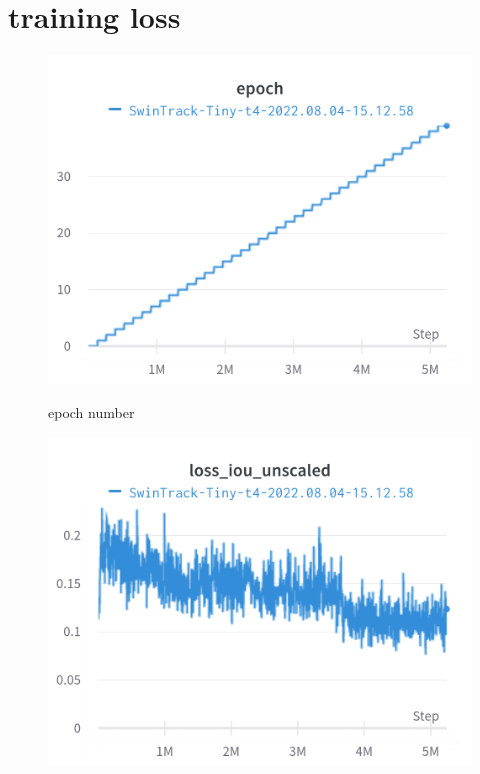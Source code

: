 \documentclass{article}
\begin{document}
\section{training loss}
\begin{figure}[h]
\includegraphics[width=\linewidth]{charts/Section-2-Panel-6-m8q6253z0}
\caption{epoch number}
\endminipage\hfill
{}
\includegraphics[width=\linewidth]{charts/Section-2-Panel-7-me6taeqzm}
\caption{}
\endminipage
\end{figure}
\end{document}

